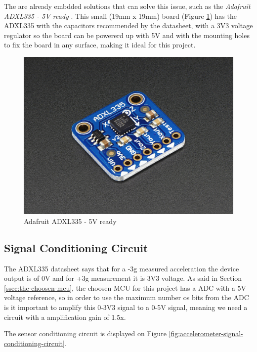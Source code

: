 	The are already embdded solutions that can solve this issue, such as the \textit{Adafruit ADXL335 - 5V ready} \cite{adafruit-5v-ready}. This small (19mm x 19mm) board (Figure \ref{fig:adafruit-adxl335}) has the ADXL335 with the capacitors recommended by the datasheet, with a 3V3 voltage regulator so the board can be powererd up with 5V and with the mounting holes to fix the board in any surface, making it ideal for this project.

	\begin{figure}[htbp]
		\centering
			\includegraphics[scale=0.2]{figuras/fig-adafruit-adxl335.jpg}
		\caption{Adafruit ADXL335 - 5V ready \cite{adafruit-adxl335}}
		\label{fig:adafruit-adxl335}
	\end{figure}


\subsection{Signal Conditioning Circuit}\label{ssec:accelerometer-signal-conditioning-circuit}

	The ADXL335 datasheet \cite{devices2010adxl335} says that for a -3g measured acceleration the device output is of 0V and for +3g measurement it is 3V3 voltage. As said in Section \ref{ssec:the-choosen-mcu}, the choosen MCU for this project has a ADC with a 5V voltage reference, so in order to use the maximum number os bits from the ADC is it important to amplify this 0-3V3 signal to a 0-5V signal, meaning we need a circuit with a amplification gain of 1.5x.
	\par
	The sensor conditioning circuit is displayed on Figure \ref{fig:accelerometer-signal-conditioning-circuit}.

